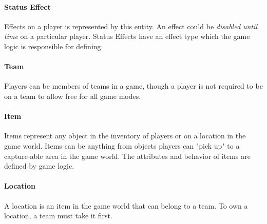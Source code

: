 \paragraph{Status Effect}
Effects on a player is represented by this entity. An effect could be \textit{disabled until time} on a particular player. Status Effects have an effect type which the game logic is responsible for defining.

\paragraph{Team}
Players can be members of teams in a game, though a player is not required to be on a team to allow free for all game modes.

\paragraph{Item}
Items represent any object in the inventory of players or on a location in the game world. Items can be anything from objects players can "pick up" to a capture-able area in the game world. The attributes and behavior of items are defined by game logic.

\paragraph{Location}
A location is an item in the game world that can belong to a team. To own a location, a team must take it first.





